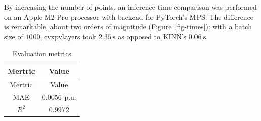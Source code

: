 \documentclass[
]{article}
\begin{document}
By increasing the number of points, an inference time comparison was
performed on an Apple M2 Pro processor with backend for PyTorch's MPS.
The difference is remarkable, about two orders of magnitude
(Figure~\ref{fig-times}): with a batch size of \(1000\), cvxpylayers
took \(2.35~\textrm{s}\) as opposed to KINN's \(0.06~\textrm{s}\).

\begin{longtable}[]{@{}cc@{}}
\caption{Evaluation metrics}\label{tbl-eval}\tabularnewline
\toprule\noalign{}
Mertric & Value \\
\midrule\noalign{}
\endfirsthead
\toprule\noalign{}
Mertric & Value \\
\midrule\noalign{}
\endhead
\bottomrule\noalign{}
\endlastfoot
MAE & 0.0056 p.u. \\
\(R^{2}\) & 0.9972 \\
\end{longtable}
\end{document}
